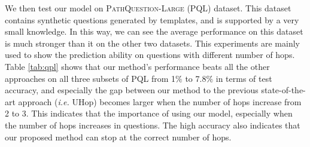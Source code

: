 We then test our model on \textsc{PathQuestion-Large} (PQL) dataset.
This dataset contains synthetic questions generated by templates, and is supported by a very small knowledge. In this way, we can see the average performance on this dataset is much stronger than it on the other two datasets. This experiments are mainly used to show the prediction ability on questions with different number of hops. Table \ref{tab:qpl} shows that our method's performance beats all the other approaches on all three subsets of PQL from 1$\%$ to 7.8$\%$ in terms of test accuracy, and especially the gap between our method to the previous state-of-the-art approach (\emph{i.e.} UHop) becomes larger when the number of hops increase from 2 to 3. This indicates that the importance of using our model, especially when the number of hops increases in questions. The high accuracy also indicates that our proposed method can stop at the correct number of hops. 